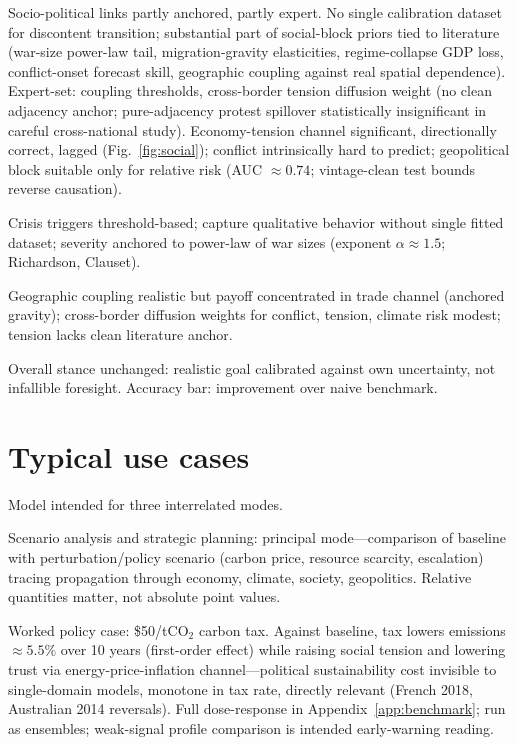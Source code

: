 \documentclass[a4paper,fleqn]{cas-sc}
\begin{document}
Socio-political links partly anchored, partly expert. No single calibration dataset for discontent transition; substantial part of social-block priors tied to literature (war-size power-law tail, migration-gravity elasticities, regime-collapse GDP loss, conflict-onset forecast skill, geographic coupling against real spatial dependence). Expert-set: coupling thresholds, cross-border tension diffusion weight (no clean adjacency anchor; pure-adjacency protest spillover statistically insignificant in careful cross-national study). Economy-tension channel significant, directionally correct, lagged (Fig.~\ref{fig:social}); conflict intrinsically hard to predict; geopolitical block suitable only for relative risk (AUC ${\approx}0.74$; vintage-clean test bounds reverse causation).

Crisis triggers threshold-based; capture qualitative behavior without single fitted dataset; severity anchored to power-law of war sizes (exponent $\alpha\approx1.5$; Richardson, Clauset).

Geographic coupling realistic but payoff concentrated in trade channel (anchored gravity); cross-border diffusion weights for conflict, tension, climate risk modest; tension lacks clean literature anchor.

Overall stance unchanged: realistic goal calibrated against own uncertainty, not infallible foresight. Accuracy bar: improvement over naive benchmark.

\section{Typical use cases}
\label{sec:scenarios}

Model intended for three interrelated modes.

Scenario analysis and strategic planning: principal mode---comparison of baseline with perturbation/policy scenario (carbon price, resource scarcity, escalation) tracing propagation through economy, climate, society, geopolitics. Relative quantities matter, not absolute point values.

Worked policy case: \$50/tCO${}_2$ carbon tax. Against baseline, tax lowers emissions ${\approx}5.5\%$ over 10 years (first-order effect) while raising social tension and lowering trust via energy-price-inflation channel---political sustainability cost invisible to single-domain models, monotone in tax rate, directly relevant (French 2018, Australian 2014 reversals). Full dose-response in Appendix~\ref{app:benchmark}; run as ensembles; weak-signal profile comparison is intended early-warning reading.
\end{document}
